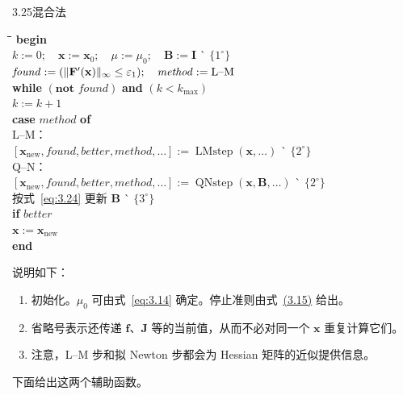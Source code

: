 \begin{algorithmbox}{3.25}{混合法}
\label{alg:3.25}
\small
\begin{tabbing}
\qquad\=\qquad\=\qquad\=\qquad\=\qquad\=\kill
\textbf{begin}\\
\> $k:=0;\quad\mathbf{x}:=\mathbf{x}_0;\quad\mu:=\mu_0;\quad \mathbf{B}:=\mathbf{I}$
   \` $\{1^{\circ}\}$\\
\> $\mathit{found}:=(\lVert\mathbf{F}'(\mathbf{x})\rVert_{\infty}\le\varepsilon_1);\quad
       \mathit{method}:=\text{L--M}$\\
\> \textbf{while} $(\textbf{not }\mathit{found})$ \textbf{and} $(k<k_{\max})$\\
\>\> $k:=k+1$\\
\>\> \textbf{case} $\mathit{method}$ \textbf{of}\\
\>\>\> L--M：\\
\>\>\>\> $[\mathbf{x}_{\mathrm{new}},\mathit{found},\mathit{better},\mathit{method},\ldots]
              :=\operatorname{LMstep}(\mathbf{x},\ldots)$
              \` $\{2^{\circ}\}$\\
\>\>\> Q--N：\\
\>\>\>\> $[\mathbf{x}_{\mathrm{new}},\mathit{found},\mathit{better},\mathit{method},\ldots]
              :=\operatorname{QNstep}(\mathbf{x},\mathbf{B},\ldots)$
              \` $\{2^{\circ}\}$\\
\>\> 按式~\eqref{eq:3.24} 更新 $\mathbf{B}$ \` $\{3^{\circ}\}$\\
\>\> \textbf{if} $\mathit{better}$\\
\>\>\> $\mathbf{x}:=\mathbf{x}_{\mathrm{new}}$\\
\textbf{end}
\end{tabbing}
\end{algorithmbox}

说明如下：
\begin{enumerate}[label=\(\arabic*^{\circ}\),leftmargin=2.8em]
  \item 初始化。$\mu_0$ 可由式~\eqref{eq:3.14} 确定。停止准则由式~\hyperref[eq:3.15a]{(3.15)} 给出。
  \item 省略号表示还传递 $\mathbf{f}$、$\mathbf{J}$ 等的当前值，从而不必对同一个 $\mathbf{x}$ 重复计算它们。
  \item 注意，L--M 步和拟 Newton 步都会为 Hessian 矩阵的近似提供信息。
\end{enumerate}
下面给出这两个辅助函数。

